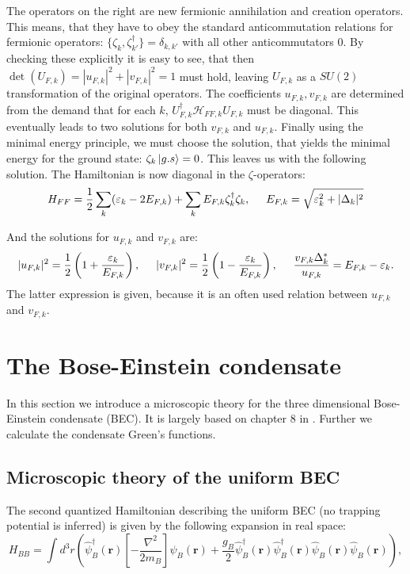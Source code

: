 The operators on the right are new fermionic annihilation and creation operators. This means, that they have to obey the standard anticommutation relations for fermionic operators: $\{\zeta_k,\zeta_{k'}^\dagger \} = \delta_{k,k'}$ with all other anticommutators 0. By checking these explicitly it is easy to see, that then $\det(U_{F,k}) = |u_{F,k}|^2+|v_{F,k}|^2 = 1$ must hold, leaving $U_{F,k}$ as a $SU(2)$ transformation of the original operators. The coefficients $u_{F,k}, v_{F,k}$ are determined from the demand that for each $k$, $U^\dagger_{F,k} \mathcal{H}_{FF,k}U_{F,k}$ must be diagonal. This eventually leads to two solutions for both $v_{F,k}$ and $u_{F,k}$. Finally using the minimal energy principle, we must choose the solution, that yields the minimal energy for the ground state: $\zeta_k\ket{g.s} = 0$. This leaves us with the following solution. The Hamiltonian is now diagonal in the $\zeta$-operators: 
\begin{equation}
H_{FF} = \frac{1}{2}\sum_k (\varepsilon_k-2E_{F,k}) + \sum_k E_{F,k} \zeta^\dagger_k \zeta_k, \hspace{0.5cm} E_{F,k} = \sqrt{\varepsilon_k^2 + |\Delta_k|^2}
\label{eq.Kitaev.H_diagonalpre}
\end{equation}

And the solutions for $u_{F,k}$ and $v_{F,k}$ are: 
\begin{equation}
|u_{F,k}|^2 = \frac{1}{2}\left(1 + \frac{\varepsilon_k}{E_{F,k}}\right), \hspace{0.5cm} |v_{F,k}|^2 = \frac{1}{2}\left(1-\frac{\varepsilon_k}{E_{F,k}}\right), \hspace{0.5cm} \frac{v_{F,k}\Delta^*_k}{u_{F,k}}=E_{F,k}-\varepsilon_k.
\label{eq.Kitaev.uk_vk}
\end{equation}
The latter expression is given, because it is an often used relation between $u_{F,k}$ and $v_{F,k}$. 


\section{The Bose-Einstein condensate}
In this section we introduce a microscopic theory for the three dimensional Bose-Einstein condensate (BEC). It is largely based on chapter 8 in \cite{Pethick}. Further we calculate the condensate Green's functions. 

\subsection{Microscopic theory of the uniform BEC}
\label{sec.BEC}
The second quantized Hamiltonian describing the uniform BEC (no trapping potential is inferred) is given by the following expansion in real space: 
\begin{equation}
H_{BB} = \int d^3 r \left(\hat{\psi}_B^\dagger(\mathbf{r})\left[-\frac{\nabla^2}{2m_B}\right]\hat{\psi}_B(\mathbf{r}) + \frac{g_B}{2}\hat{\psi}_B^\dagger(\mathbf{r})\hat{\psi}_B^\dagger(\mathbf{r})\hat{\psi}_B(\mathbf{r})\hat{\psi}_B(\mathbf{r})  \right), 
\end{equation}

